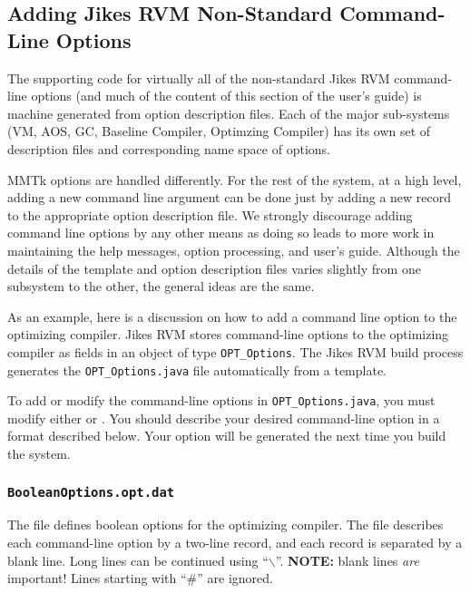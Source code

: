 %
\subsection{Adding Jikes RVM Non-Standard Command-Line Options}
The supporting code for virtually all of the non-standard
Jikes\TMweb{} RVM command-line options (and much of the content of
this section of the user's guide) is machine generated from
option description files.  Each of the major sub-systems (VM, AOS, GC,
Baseline Compiler, Optimzing Compiler) has its own set of description
files and corresponding name space of options. 

MMTk options are handled differently.  For the rest of the system, at a
high level, adding a new command line argument  can be done just 
by adding a new record to the appropriate option description file.  We
strongly discourage adding command line options by any other means as
doing so leads to more work in maintaining the help messages, option
processing, and user's guide. Although the details of the template and
option description files varies slightly from one subsystem to the
other, the general ideas are the same.  

%
As an example, here is a discussion on how to add a command line
option to the optimizing compiler.
Jikes RVM stores command-line options to the optimizing compiler 
as fields in an object of type {\tt OPT\_Options}.
The Jikes RVM build process generates the {\tt OPT\_Options.java} 
file automatically from a template.  

To add or modify the command-line options in {\tt OPT\_Options.java},
you must modify either  or 
.  You should describe your desired
command-line option in a format described below.
Your option will be generated the next time you build the
system.

\subsubsection{\texttt{BooleanOptions.opt.dat}}

The  file defines boolean options for
the optimizing compiler.  The file describes each command-line option 
by a two-line record, and each record is separated
by a blank line.  Long lines can be continued using ``$\backslash$''.
{\bf NOTE:} blank lines {\em are} important!
Lines starting with ``\#'' are ignored.

